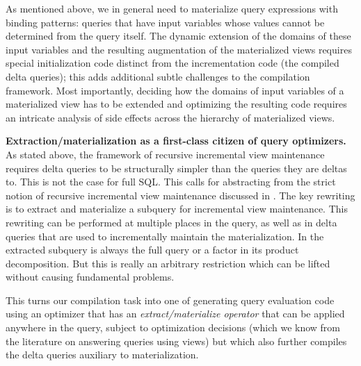 
As mentioned above, we in general need to materialize query expressions with binding patterns: queries that have input variables whose values cannot be determined from the query itself. The dynamic extension of the domains of these input variables and the resulting augmentation of the materialized views requires special initialization code distinct from the incrementation code (the compiled delta queries); this adds additional subtle challenges to the compilation framework. Most importantly, deciding how the domains of input variables of a materialized view has to be extended and optimizing the resulting code requires an intricate analysis of side effects across the hierarchy of materialized views.



{\bf Extraction/materialization as a first-class citizen of query optimizers.}
%
As stated above, the framework of recursive incremental view maintenance requires delta queries to be structurally simpler than the queries they are deltas to. This is not the case for full SQL. This calls for abstracting from the strict notion of recursive incremental view maintenance discussed in \cite{ahmad-vldb:09, koch-pods:10}. The key rewriting is to extract and materialize a subquery for incremental view maintenance. This rewriting can be performed at multiple places in the query, as well as in delta queries that are used to incrementally maintain the materialization. In \cite{ahmad-vldb:09, koch-pods:10} the extracted subquery is always the full query or a factor in its product decomposition. But this is really an arbitrary restriction which can be lifted without causing fundamental problems.

This turns our compilation task into one of generating query evaluation code using an optimizer that has an {\em extract/materialize operator} that can be applied anywhere in the query, subject to optimization decisions (which we know from the literature on answering queries using views) but which also further compiles the delta queries auxiliary to materialization.

